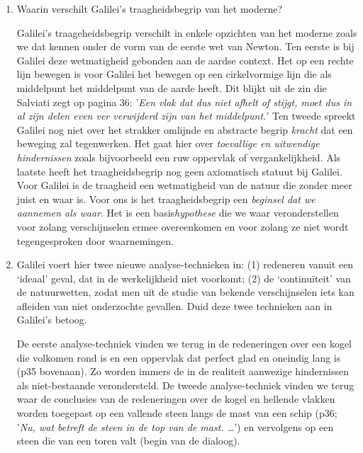 \begin{enumerate}
\item Waarin verschilt Galilei's traagheidsbegrip van het moderne?
\begin{oplossing}
\newline
Galilei's traageheidsbegrip verschilt in enkele opzichten van het moderne zoals we dat kennen onder de vorm van de eerste wet van Newton. Ten eerste is bij Galilei deze wetmatigheid gebonden aan de aardse context. Het op een rechte lijn bewegen is voor Galilei het bewegen op een cirkelvormige lijn die als middelpunt het middelpunt van de aarde heeft. Dit blijkt uit de zin die Salviati zegt op pagina 36: '\emph{Een vlak dat dus niet afhelt of stijgt, moet dus in al zijn delen even ver verwijderd zijn van het middelpunt.}' Ten tweede spreekt Galilei nog niet over het strakker omlijnde en abstracte begrip \emph{kracht} dat een beweging zal tegenwerken. Het gaat hier over \emph{toevallige en uitwendige hindernissen} zoals bijvoorbeeld een ruw oppervlak of vergankelijkheid. Als laatste heeft het traagheidsbegrip nog geen axiomatisch statuut bij Galilei. Voor Galilei is de traagheid een wetmatigheid van de natuur die zonder meer juist en waar is. Voor ons is het traagheidsbegrip een \emph{beginsel dat we aannemen als waar}. Het is een basis\emph{hypothese} die we waar veronderstellen voor zolang verschijnselen ermee overeenkomen en voor zolang ze niet wordt tegengesproken door waarnemingen.
\end{oplossing}

\item Galilei voert hier twee nieuwe analyse-technieken in: (1) redeneren vanuit een `ideaal' geval, dat in de werkelijkheid niet voorkomt; (2) de `continu\"iteit' van de natuurwetten, zodat men uit de studie van bekende verschijnselen iets kan afleiden van niet onderzochte gevallen. Duid deze twee technieken aan in Galilei's betoog.
\begin{oplossing}
\newline
De eerste analyse-techniek vinden we terug in de redeneringen over een kogel die volkomen rond is en een oppervlak dat perfect glad en oneindig lang is (p35 bovenaan). Zo worden immers de in de realiteit aanwezige hindernissen als niet-bestaande verondersteld.
\newline
De tweede analyse-techniek vinden we terug waar de conclusies van de redeneringen over de kogel en hellende vlakken worden toegepast op een vallende steen langs de mast van een schip (p36; '\emph{Nu, wat betreft de steen in de top van de mast. \ldots}') en vervolgens op een steen die van een toren valt (begin van de dialoog).
\end{oplossing}


\end{enumerate}
